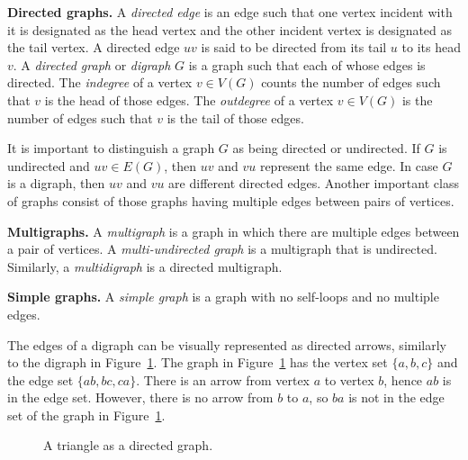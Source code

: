 \begin{definition}
\textbf{Directed graphs.}
A \emph{directed edge} is an edge such that one vertex incident with it
is designated as the head vertex and the other incident vertex is
designated as the tail vertex. A directed edge $uv$ is said to be
directed from its tail $u$ to its head $v$. A \emph{directed graph} or
\emph{digraph} $G$ is a graph such that each of whose edges is
directed. The \emph{indegree} of a vertex $v \in V(G)$ counts the
number of edges such that $v$ is the head of those edges. The
\emph{outdegree} of a vertex $v \in V(G)$ is the number of edges such
that $v$ is the tail of those edges.
\end{definition}

It is important to distinguish a graph $G$ as being directed or
undirected. If $G$ is undirected and $uv \in E(G)$, then $uv$ and $vu$
represent the same edge. In case $G$ is a digraph, then $uv$ and $vu$
are different directed edges. Another important class of graphs
consist of those graphs having multiple edges between pairs of
vertices.

\begin{definition}
\textbf{Multigraphs.}
A \emph{multigraph} is a graph in which there are multiple edges
between a pair of vertices. A \emph{multi-undirected graph} is a
multigraph that is undirected. Similarly, a \emph{multidigraph} is a
directed multigraph.
\end{definition}

\begin{definition}
\textbf{Simple graphs.}
A \emph{simple graph} is a graph with no self-loops and no multiple
edges.
\end{definition}

The edges of a digraph can be visually represented as directed arrows,
similarly to the digraph in
Figure~\ref{fig:introduction:directed_triangle_graph}. The graph in
Figure~\ref{fig:introduction:directed_triangle_graph} has the vertex
set $\{ a, b, c \}$ and the edge set $\{ ab, bc, ca \}$. There is an
arrow from vertex $a$ to vertex $b$, hence $ab$ is in the edge
set. However, there is no arrow from $b$ to $a$, so $ba$ is not in the
edge set of the graph in
Figure~\ref{fig:introduction:directed_triangle_graph}.

\begin{figure}[!htbp]
\centering
{}
\caption{A triangle as a directed graph.}
\label{fig:introduction:directed_triangle_graph}
\end{figure}

